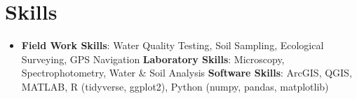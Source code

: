 \documentclass[letterpaper,11pt]{article}
\newcommand{\resumeSubHeadingListStart}{\begin{itemize}[leftmargin=*]}
\newcommand{\resumeSubHeadingListEnd}{\end{itemize}}
\begin{document}
\section{Skills}
  \resumeSubHeadingListStart
    \item{
      \textbf{Field Work Skills}{: Water Quality Testing, Soil Sampling, Ecological Surveying, GPS Navigation}
      \hfill
      \textbf{Laboratory Skills}{: Microscopy, Spectrophotometry, Water & Soil Analysis}
      \hfill
      \textbf{Software Skills}{: ArcGIS, QGIS, MATLAB, R (tidyverse, ggplot2), Python (numpy, pandas, matplotlib)}
      \hfill
    }
  \resumeSubHeadingListEnd
\end{document}
